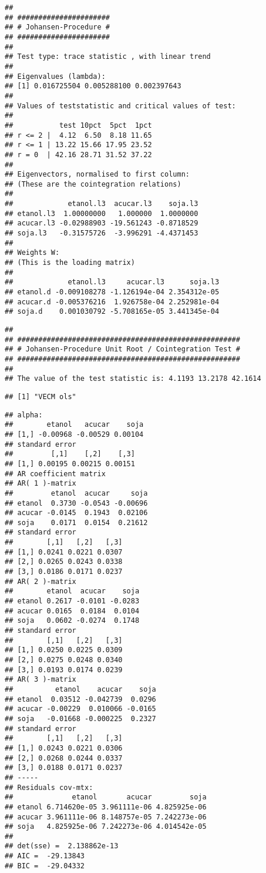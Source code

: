 \documentclass[]{article}
\begin{document}
\begin{verbatim}
## 
## ###################### 
## # Johansen-Procedure # 
## ###################### 
## 
## Test type: trace statistic , with linear trend 
## 
## Eigenvalues (lambda):
## [1] 0.016725504 0.005288100 0.002397643
## 
## Values of teststatistic and critical values of test:
## 
##           test 10pct  5pct  1pct
## r <= 2 |  4.12  6.50  8.18 11.65
## r <= 1 | 13.22 15.66 17.95 23.52
## r = 0  | 42.16 28.71 31.52 37.22
## 
## Eigenvectors, normalised to first column:
## (These are the cointegration relations)
## 
##             etanol.l3  acucar.l3    soja.l3
## etanol.l3  1.00000000   1.000000  1.0000000
## acucar.l3 -0.02988903 -19.561243 -0.8718529
## soja.l3   -0.31575726  -3.996291 -4.4371453
## 
## Weights W:
## (This is the loading matrix)
## 
##             etanol.l3     acucar.l3      soja.l3
## etanol.d -0.009108278 -1.126194e-04 2.354312e-05
## acucar.d -0.005376216  1.926758e-04 2.252981e-04
## soja.d    0.001030792 -5.708165e-05 3.441345e-04
\end{verbatim}

\begin{verbatim}
## 
## ##################################################### 
## # Johansen-Procedure Unit Root / Cointegration Test # 
## ##################################################### 
## 
## The value of the test statistic is: 4.1193 13.2178 42.1614
\end{verbatim}

\begin{verbatim}
## [1] "VECM ols"
\end{verbatim}

\begin{verbatim}
## alpha:  
##        etanol   acucar    soja
## [1,] -0.00968 -0.00529 0.00104
## standard error 
##         [,1]    [,2]    [,3]
## [1,] 0.00195 0.00215 0.00151
## AR coefficient matrix 
## AR( 1 )-matrix 
##         etanol  acucar     soja
## etanol  0.3730 -0.0543 -0.00696
## acucar -0.0145  0.1943  0.02106
## soja    0.0171  0.0154  0.21612
## standard error 
##        [,1]   [,2]   [,3]
## [1,] 0.0241 0.0221 0.0307
## [2,] 0.0265 0.0243 0.0338
## [3,] 0.0186 0.0171 0.0237
## AR( 2 )-matrix 
##        etanol  acucar    soja
## etanol 0.2617 -0.0101 -0.0283
## acucar 0.0165  0.0184  0.0104
## soja   0.0602 -0.0274  0.1748
## standard error 
##        [,1]   [,2]   [,3]
## [1,] 0.0250 0.0225 0.0309
## [2,] 0.0275 0.0248 0.0340
## [3,] 0.0193 0.0174 0.0239
## AR( 3 )-matrix 
##          etanol    acucar    soja
## etanol  0.03512 -0.042739  0.0296
## acucar -0.00229  0.010066 -0.0165
## soja   -0.01668 -0.000225  0.2327
## standard error 
##        [,1]   [,2]   [,3]
## [1,] 0.0243 0.0221 0.0306
## [2,] 0.0268 0.0244 0.0337
## [3,] 0.0188 0.0171 0.0237
## ----- 
## Residuals cov-mtx: 
##              etanol       acucar         soja
## etanol 6.714620e-05 3.961111e-06 4.825925e-06
## acucar 3.961111e-06 8.148757e-05 7.242273e-06
## soja   4.825925e-06 7.242273e-06 4.014542e-05
##        
## det(sse) =  2.138862e-13 
## AIC =  -29.13843 
## BIC =  -29.04332
\end{verbatim}
\end{document}
